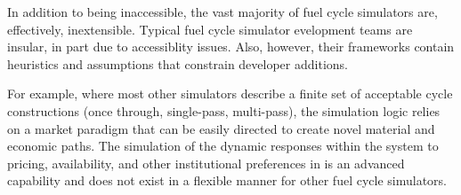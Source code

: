 In addition to being inaccessible, the vast majority of fuel cycle simulators
are, effectively, inextensible. Typical fuel cycle simulator evelopment teams are insular, in
part due to accessiblity issues. Also, however, their frameworks contain
heuristics and assumptions that constrain developer additions.

For example, where most other simulators describe a finite set of acceptable
cycle constructions (once through, single-pass, multi-pass), the \Cyclus
simulation logic relies on a market paradigm that can be easily directed to
create novel material and economic paths. The simulation of the dynamic
responses within the system to pricing, availability, and other institutional
preferences in \Cyclus is an advanced capability and does not exist in a
flexible manner for other fuel cycle simulators.


